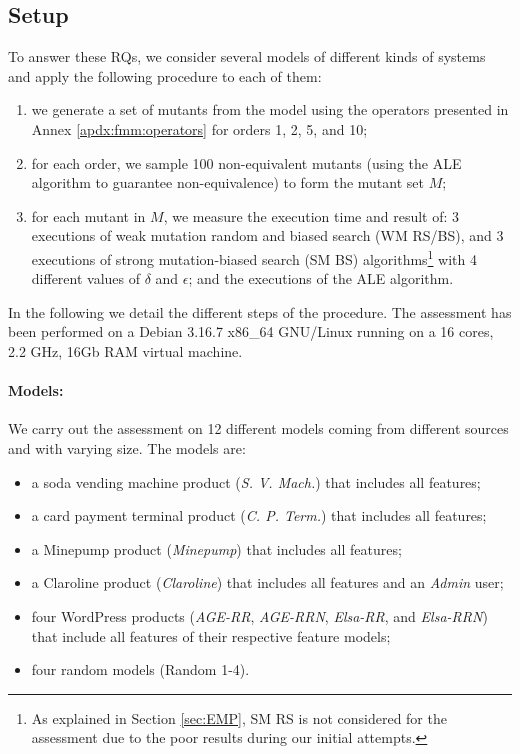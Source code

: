 \subsection{Setup}

To answer these RQs, we consider several models of different kinds of systems and apply the following procedure to each of them:
\begin{enumerate}
\item we generate a set of mutants from the model using the operators presented in Annex \ref{apdx:fmm:operators} for orders 1, 2, 5, and 10;
\item for each order, we sample 100 non-equivalent mutants (using the ALE algorithm to guarantee non-equivalence) to form the mutant set $M$;
\item for each mutant in $M$, we measure the execution time and result of: 3 executions of weak mutation random and biased search (WM RS/BS), and 3 executions of strong mutation-biased search (SM BS) algorithms\footnote{As explained in Section \ref{sec:EMP}, SM RS is not considered for the assessment due to the poor results during our initial attempts.} with 4 different values of $\delta$ and $\epsilon$; and the executions of the ALE algorithm.
\end{enumerate}
In the following we detail the different steps of the procedure. The assessment has been performed on a Debian 3.16.7 x86\_64 GNU/Linux running on a 16 cores, 2.2 GHz, 16Gb RAM virtual machine.

\paragraph{Models:}

We carry out the assessment on 12 different models coming from different sources and with varying size. The models are:
\begin{itemize}
\item a soda vending machine product (\textit{S. V. Mach.}) that includes all features;
\item a card payment terminal product (\textit{C. P. Term.}) that includes all features;
\item a Minepump product (\textit{Mine\-pump}) that includes all features;
\item a Claroline product (\textit{Claroline}) that includes all features and an \textit{Admin} user;
\item four WordPress products (\textit{AGE-RR}, \textit{AGE-RRN}, \textit{Elsa-RR}, and \textit{Elsa-RRN}) that include all features of their respective feature models;
\item four random models (Random 1-4).
\end{itemize}


